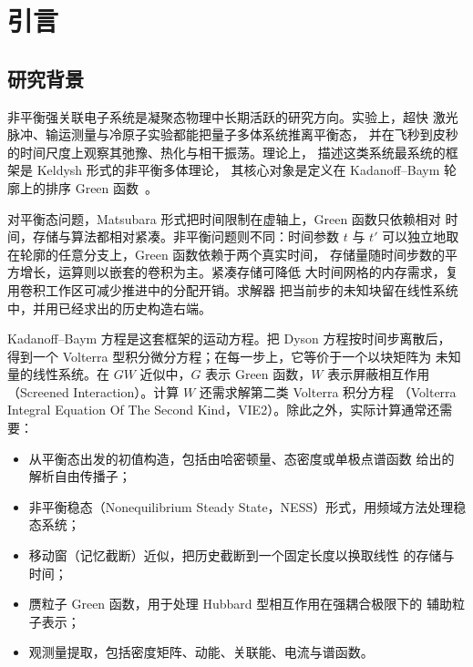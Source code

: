 \chapter{引言}
\label{ch:intro}

\section{研究背景}
\label{sec:background}

非平衡强关联电子系统是凝聚态物理中长期活跃的研究方向。实验上，超快
激光脉冲、输运测量与冷原子实验都能把量子多体系统推离平衡态，
并在飞秒到皮秒的时间尺度上观察其弛豫、热化与相干振荡。理论上，
描述这类系统最系统的框架是 Keldysh 形式的非平衡多体理论，
其核心对象是定义在 Kadanoff--Baym 轮廓上的排序 Green 函数~\cite{kadanoff1962,keldysh1965}。

对平衡态问题，Matsubara 形式把时间限制在虚轴上，Green 函数只依赖相对
时间，存储与算法都相对紧凑。非平衡问题则不同：时间参数 $t$ 与 $t'$
可以独立地取在轮廓的任意分支上，Green 函数依赖于两个真实时间，
存储量随时间步数的平方增长，运算则以嵌套的卷积为主。紧凑存储可降低
大时间网格的内存需求，复用卷积工作区可减少推进中的分配开销。求解器
把当前步的未知块留在线性系统中，并用已经求出的历史构造右端。

Kadanoff--Baym 方程是这套框架的运动方程。把 Dyson 方程按时间步离散后，
得到一个 Volterra 型积分微分方程；在每一步上，它等价于一个以块矩阵为
未知量的线性系统。在 $GW$ 近似中，$G$ 表示 Green 函数，$W$ 表示屏蔽相互作用
（Screened Interaction）。计算 $W$ 还需求解第二类 Volterra 积分方程
（Volterra Integral Equation Of The Second Kind，VIE2）。除此之外，实际计算通常还需要：
\begin{itemize}
    \item 从平衡态出发的初值构造，包括由哈密顿量、态密度或单极点谱函数
          给出的解析自由传播子；
    \item 非平衡稳态（Nonequilibrium Steady State，NESS）形式，用频域方法处理稳态系统；
    \item 移动窗（记忆截断）近似，把历史截断到一个固定长度以换取线性
          的存储与时间；
    \item 赝粒子 Green 函数，用于处理 Hubbard 型相互作用在强耦合极限下的
          辅助粒子表示；
    \item 观测量提取，包括密度矩阵、动能、关联能、电流与谱函数。
\end{itemize}

